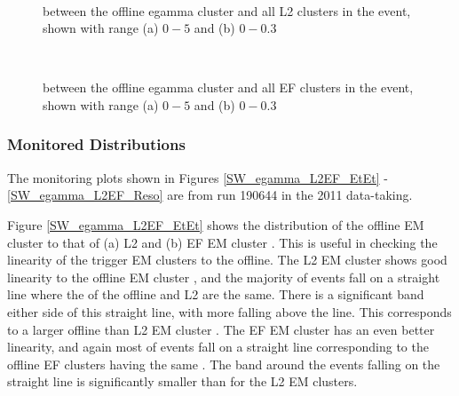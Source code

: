 \begin{figure}
\centering
\mbox{
   \quad
      \quad
}
\caption[\dr{} between offline and L2 egamma object]{\dr{} between the offline egamma cluster and all L2 clusters in the event, shown with range (a) $0 - 5$ and (b) $0 - 0.3$ \label{SW_egamma_L2_dR}}
\end{figure}

\begin{figure}
\centering
\mbox{
   \quad
      \quad
}
\caption[\dr{} between offline and EF egamma object]{\dr{} between the offline egamma cluster and all EF clusters in the event, shown with range (a) $0 - 5$ and (b) $0 - 0.3$\label{SW_egamma_EF_dR}}
\end{figure}




\subsubsection{Monitored Distributions}


The monitoring plots shown in Figures \ref{SW_egamma_L2EF_EtEt} -\ref{SW_egamma_L2EF_Reso} are from run 190644 in the  2011 data-taking.


Figure \ref{SW_egamma_L2EF_EtEt} shows the distribution of the offline EM cluster \et{} to that of (a) L2 and (b) EF EM cluster \et{}.
This is useful in checking the linearity of the trigger EM clusters to the offline. 
The L2 EM cluster \et{} shows good linearity to the offline EM cluster \et{}, and the majority of events fall on a straight line where the \et{} of the offline and L2 are the same.
There is a significant band either side of this straight line, with more falling above the line.
This corresponds to a larger offline \et{} than L2 EM cluster \et{}.
The EF EM cluster \et{} has an even better linearity, and again most of events fall on a straight line corresponding to the offline EF clusters having the same \et{}.
The band around the events falling on the straight line is significantly smaller than for the L2 EM clusters.


